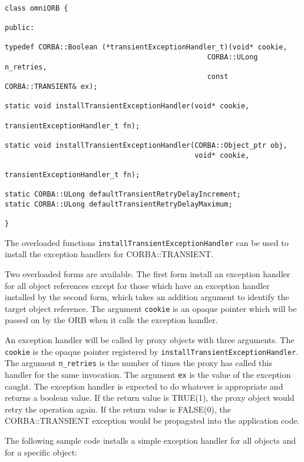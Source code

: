 \documentclass[11pt,twoside,onecolumn]{book}
\begin{document}
{\small
\begin{verbatim}

class omniORB {

public:
  
typedef CORBA::Boolean (*transientExceptionHandler_t)(void* cookie,
                                                CORBA::ULong n_retries,
                                                const CORBA::TRANSIENT& ex);

static void installTransientExceptionHandler(void* cookie,
                                             transientExceptionHandler_t fn);

static void installTransientExceptionHandler(CORBA::Object_ptr obj,
                                             void* cookie,
                                             transientExceptionHandler_t fn);
  
static CORBA::ULong defaultTransientRetryDelayIncrement;
static CORBA::ULong defaultTransientRetryDelayMaximum;

}

\end{verbatim}
}

The overloaded functions {\tt installTransientExceptionHandler}
can be used to install the exception handlers for CORBA::TRANSIENT.

Two overloaded forms are available. The first form install an
exception handler for all object references except for those which
have an exception handler installed by the second form, which takes
an addition argument to identify the target object reference.
The argument {\tt cookie} is an opaque pointer which will be passed
on by the ORB when it calls the exception handler.

An exception handler will be called by proxy objects with three
arguments. The {\tt cookie} is the opaque pointer registered by
{\tt installTransientExceptionHandler}. The argument {\tt n\_retries} is
the number of times the proxy has called this handler for the same
invocation. The argument {\tt ex} is the value of the exception caught.
The exception handler is expected to do whatever is appropriate and returns
a boolean value. If the return value is TRUE(1), the proxy object would
retry the operation again. If the return value is FALSE(0), the
CORBA::TRANSIENT exception would be propagated into the application code.

The following sample code installs a simple exception handler for all
objects and for a specific object:
\end{document}
